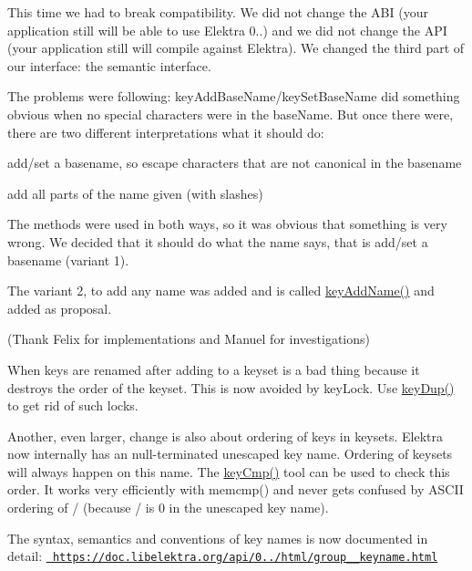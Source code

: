 This time we had to break compatibility. We did not change the A\+BI (your application still will be able to use Elektra 0..) and we did not change the A\+PI (your application still will compile against Elektra). We changed the third part of our interface\+: the semantic interface.

The problems were following\+: key\+Add\+Base\+Name/key\+Set\+Base\+Name did something obvious when no special characters were in the base\+Name. But once there were, there are two different interpretations what it should do\+:


\begin{DoxyEnumerate}
\item add/set a basename, so escape characters that are not canonical in the basename
\item add all parts of the name given (with slashes)
\end{DoxyEnumerate}

The methods were used in both ways, so it was obvious that something is very wrong. We decided that it should do what the name says, that is add/set a basename (variant 1).

The variant 2, to add any name was added and is called \mbox{\hyperlink{group__keyname_gaa70593a2c772c4b7bc33423b9b10a270}{key\+Add\+Name()}} and added as proposal.

(Thank Felix for implementations and Manuel for investigations)

When keys are renamed after adding to a keyset is a bad thing because it destroys the order of the keyset. This is now avoided by key\+Lock. Use \mbox{\hyperlink{group__key_gae6ec6a60cc4b8c1463fa08623d056ce3}{key\+Dup()}} to get rid of such locks.

Another, even larger, change is also about ordering of keys in keysets. Elektra now internally has an null-\/terminated unescaped key name. Ordering of keysets will always happen on this name. The {\ttfamily \mbox{\hyperlink{group__keytest_gaf6e66e12fe04d535a5d1c8218ced803e}{key\+Cmp()}}} tool can be used to check this order. It works very efficiently with {\ttfamily memcmp()} and never gets confused by A\+S\+C\+II ordering of / (because / is 0 in the unescaped key name).

The syntax, semantics and conventions of key names is now documented in detail\+: \href{https://doc.libelektra.org/api/0.8.8/html/group__keyname.html}{\texttt{ https\+://doc.\+libelektra.\+org/api/0../html/group\+\_\+\+\_\+keyname.\+html}}

